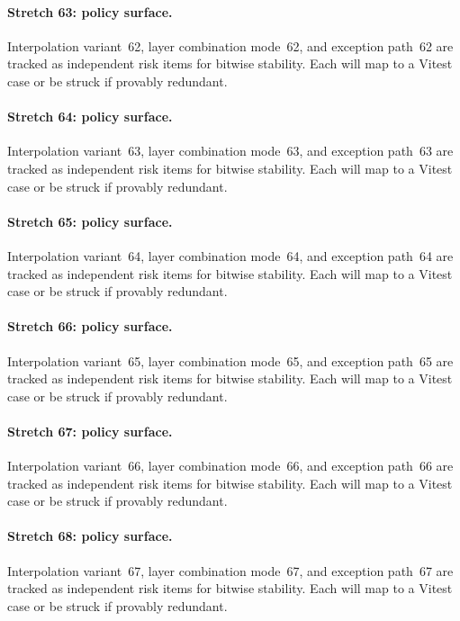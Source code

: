 \documentclass[sigconf,nonacm]{acmart}
\begin{document}
\paragraph{Stretch 63: policy surface.}
Interpolation variant~62, layer combination mode~62, and exception path~62 are tracked as independent risk items for bitwise stability. Each will map to a Vitest case or be struck if provably redundant. %

\paragraph{Stretch 64: policy surface.}
Interpolation variant~63, layer combination mode~63, and exception path~63 are tracked as independent risk items for bitwise stability. Each will map to a Vitest case or be struck if provably redundant. %

\paragraph{Stretch 65: policy surface.}
Interpolation variant~64, layer combination mode~64, and exception path~64 are tracked as independent risk items for bitwise stability. Each will map to a Vitest case or be struck if provably redundant. %

\paragraph{Stretch 66: policy surface.}
Interpolation variant~65, layer combination mode~65, and exception path~65 are tracked as independent risk items for bitwise stability. Each will map to a Vitest case or be struck if provably redundant. %

\paragraph{Stretch 67: policy surface.}
Interpolation variant~66, layer combination mode~66, and exception path~66 are tracked as independent risk items for bitwise stability. Each will map to a Vitest case or be struck if provably redundant. %

\paragraph{Stretch 68: policy surface.}
Interpolation variant~67, layer combination mode~67, and exception path~67 are tracked as independent risk items for bitwise stability. Each will map to a Vitest case or be struck if provably redundant. %
\end{document}
